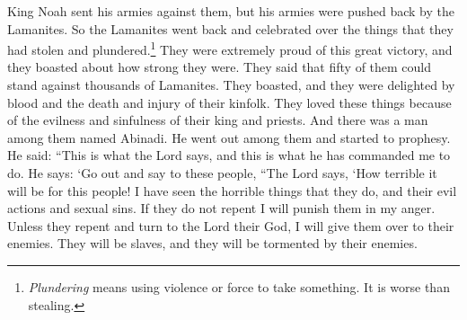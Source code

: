\bverse \iffalse And it came to pass that king Noah sent his armies against them, and they were driven back, or they drove them back for a time; therefore, they returned rejoicing in their spoil. \fi
King Noah sent his armies against them, but his armies were pushed back by the Lamanites. So the Lamanites went back and celebrated over the things that they had stolen and plundered.\footnote{\textit{Plundering} means using violence or force to take something. It is worse than stealing.}
\bverse \iffalse And now, because of this great victory they were lifted up in the pride of their hearts; they did boast in their own strength, saying that their fifty could stand against thousands of the Lamanites; and thus they did boast, and did delight in blood, and the shedding of the blood of their brethren, and this because of the wickedness of their king and priests. \fi
They were extremely proud of this great victory, and they boasted about how strong they were. They said that fifty of them could stand against thousands of Lamanites. They boasted, and they were delighted by blood and the death and injury of their kinfolk. They loved these things because of the evilness and sinfulness of their king and priests.
\bverse \iffalse And it came to pass that there was a man among them whose name was Abinadi; and he went forth among them, and began to prophesy, saying: Behold, thus saith the Lord, and thus hath he commanded me, saying, Go forth, and say unto this people, thus saith the Lord--Wo be unto this people, for I have seen their abominations, and their wickedness, and their whoredoms; and except they repent I will visit them in mine anger. \fi
And there was a man among them named Abinadi. He went out among them and started to prophesy. He said: ``This is what the Lord says, and this is what he has commanded me to do. He says: \lq Go out and say to these people, ``The Lord says, \lq How terrible it will be for this people! I have seen the horrible things that they do, and their evil actions and sexual sins. If they do not repent I will punish them in my anger.
\bverse \iffalse And except they repent and turn to the Lord their God, behold, I will deliver them into the hands of their enemies; yea, and they shall be brought into bondage; and they shall be afflicted by the hand of their enemies. \fi
Unless they repent and turn to the Lord their God, I will give them over to their enemies. They will be slaves, and they will be tormented by their enemies.
\bverse \iffalse And it shall come to pass that they shall know that I am the Lord their God, and am a jealous God, visiting the iniquities of my people. \fi
